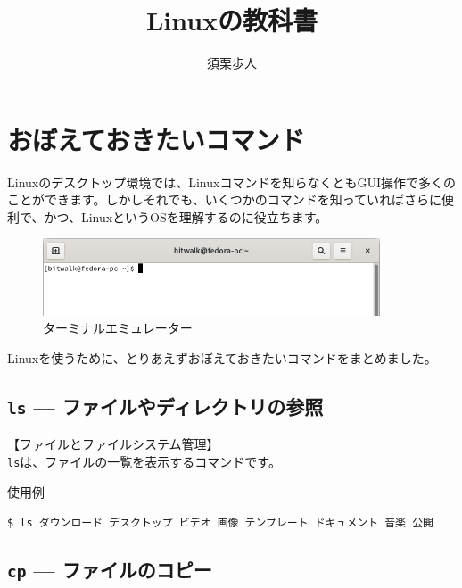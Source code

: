 \documentclass[a4j]{jreport}
\begin{document}
\title{Linuxの教科書}
\author{須栗歩人}
\maketitle

\tableofcontents

\chapter{おぼえておきたいコマンド}

Linuxのデスクトップ環境では、Linuxコマンドを知らなくともGUI操作で多くのことができます。しかしそれでも、いくつかのコマンドを知っていればさらに便利で、かつ、LinuxというOSを理解するのに役立ちます。

\begin{figure}[H]
	\centering
	\includegraphics[width=10cm]{pic/gnome-terminal.png}
	\caption{ターミナルエミュレーター}
\end{figure}

Linuxを使うために、とりあえずおぼえておきたいコマンドをまとめました。\\

\section{\texttt{ls} --- ファイルやディレクトリの参照}

【ファイルとファイルシステム管理】\\

\texttt{ls}は、ファイルの一覧を表示するコマンドです。\\

\begin{itembox}[l]{使用例}
	\begin{alltt}\texttt{\$ ls
		ダウンロード  デスクトップ  ビデオ  画像
		テンプレート  ドキュメント  音楽    公開}\end{alltt}
\end{itembox}

\section{\texttt{cp} --- ファイルのコピー}
\end{document}
